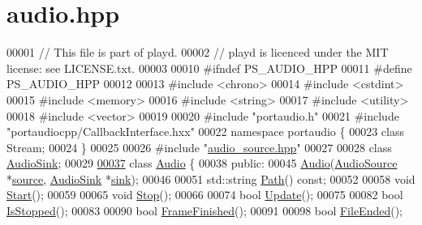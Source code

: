 \hypertarget{audio_8hpp_source}{\section{audio.\+hpp}
\label{audio_8hpp_source}
}

\begin{DoxyCode}
00001 \textcolor{comment}{// This file is part of playd.}
00002 \textcolor{comment}{// playd is licenced under the MIT license: see LICENSE.txt.}
00003 
00010 \textcolor{preprocessor}{#ifndef PS\_AUDIO\_HPP}
00011 \textcolor{preprocessor}{#define PS\_AUDIO\_HPP}
00012 
00013 \textcolor{preprocessor}{#include <chrono>}
00014 \textcolor{preprocessor}{#include <cstdint>}
00015 \textcolor{preprocessor}{#include <memory>}
00016 \textcolor{preprocessor}{#include <string>}
00017 \textcolor{preprocessor}{#include <utility>}
00018 \textcolor{preprocessor}{#include <vector>}
00019 
00020 \textcolor{preprocessor}{#include "portaudio.h"}
00021 \textcolor{preprocessor}{#include "portaudiocpp/CallbackInterface.hxx"}
00022 \textcolor{keyword}{namespace }portaudio \{
00023 \textcolor{keyword}{class }Stream;
00024 \}
00025 
00026 \textcolor{preprocessor}{#include "\hyperlink{audio__source_8hpp}{audio\_source.hpp}"}
00027 
00028 \textcolor{keyword}{class }\hyperlink{classAudioSink}{AudioSink};
00029 
\hypertarget{audio_8hpp_source_l00037}{}\hyperlink{classAudio}{00037} \textcolor{keyword}{class }\hyperlink{classAudio}{Audio} \{
00038 \textcolor{keyword}{public}:
00045     \hyperlink{classAudio_a05b36040e9d4ea4327de7c04f2e9d6ba}{Audio}(\hyperlink{classAudioSource}{AudioSource} *\hyperlink{classAudio_a0efa7be67424d967c551ecc82cda02eb}{source}, \hyperlink{classAudioSink}{AudioSink} *\hyperlink{classAudio_ae7dddd283486a0d1555e9bc6a0d63cff}{sink});
00046 
00051     std::string \hyperlink{classAudio_a07d67a424301e3e859e78fe30fb05d68}{Path}() \textcolor{keyword}{const};
00052 
00058     \textcolor{keywordtype}{void} \hyperlink{classAudio_a545c9a12f31bc6964ac90bbf2358ada2}{Start}();
00059 
00065     \textcolor{keywordtype}{void} \hyperlink{classAudio_a1bd980bcdd3778875b019d7352e75754}{Stop}();
00066 
00074     \textcolor{keywordtype}{bool} \hyperlink{classAudio_a6db65dd8ffbd616d3f5dc81b5144c864}{Update}();
00075 
00082     \textcolor{keywordtype}{bool} \hyperlink{classAudio_ac05b824652de67714008e891b77dc362}{IsStopped}();
00083 
00090     \textcolor{keywordtype}{bool} \hyperlink{classAudio_afab4e39f1e74e9a20ab456da2944a3aa}{FrameFinished}();
00091 
00098     \textcolor{keywordtype}{bool} \hyperlink{classAudio_a55e15a8f6e55f018a60fb477959801e5}{FileEnded}();

\end{DoxyCode}
